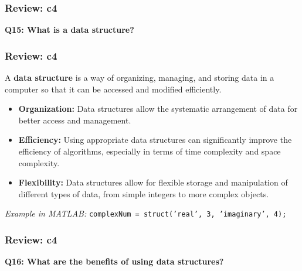 \documentclass[
	11pt, %
]{beamer}
\begin{document}

\begin{frame}
	\frametitle{Review: c4}

	\textbf{Q15: What is a data structure?}

\end{frame}


\begin{frame}
	\frametitle{Review: c4}
 
    A \textbf{data structure} is a way of organizing, managing, and storing data in a computer so that it can be accessed and modified efficiently.

    \begin{itemize}
        \item \textbf{Organization:} Data structures allow the systematic arrangement of data for better access and management.
        \item \textbf{Efficiency:} Using appropriate data structures can significantly improve the efficiency of algorithms, especially in terms of time complexity and space complexity.
        \item \textbf{Flexibility:} Data structures allow for flexible storage and manipulation of different types of data, from simple integers to more complex objects.
    \end{itemize}

    \textit{Example in MATLAB:}
    \texttt{complexNum = struct('real', 3, 'imaginary', 4);}
    
\end{frame}


\begin{frame}
	\frametitle{Review: c4}

	\textbf{Q16: What are the benefits of using data structures?}

\end{frame}

\end{document}
